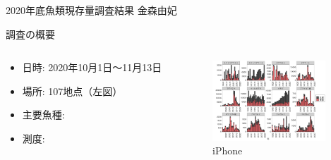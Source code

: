 \documentclass{beamer}
\begin{document}
\begin{frame}{2020年底魚類現存量調査結果}
金森由妃 
\end{frame}

\begin{frame}{調査の概要}
 \begin{columns}[t]
    \begin{column}{0.7\textwidth}
      \begin{itemize}
  \item 日時: 2020年10月1日〜11月13日
  \item 場所: 107地点（左図）
  \item 主要魚種: 
  \item 測度: 
      \end{itemize}
    \end{column}
    \begin{column}{0.3\textwidth} 
      \begin{figure}
        \begin{center}
          \includegraphics[height=3.0cm]{trendabst.png}
          \caption{iPhone}
        \end{center}   
      \end{figure}
    \end{column}
  \end{columns}
\end{frame}
\end{document}
